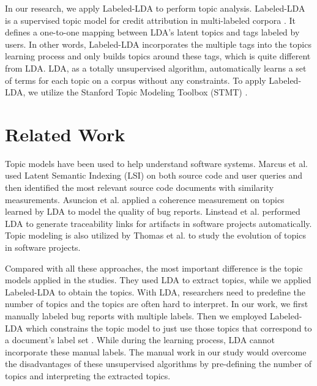 \documentclass[10pt, conference, compsocconf]{IEEEtran}
\begin{document}
In our research, we apply Labeled-LDA to perform topic analysis. Labeled-LDA is a supervised topic model for credit attribution in multi-labeled corpora \cite{labeledlda}. It defines a one-to-one mapping between LDA's latent topics and tags labeled by users. In other words, Labeled-LDA incorporates the multiple tags into the topics learning process and only builds topics around these tags, which is quite different from LDA. LDA, as a totally unsupervised algorithm, automatically learns a set of terms for each topic on a corpus without any constraints. To apply Labeled-LDA, we utilize the Stanford Topic Modeling Toolbox (STMT) \cite{stmt}. 




\section{Related Work}
\label{sec:relatedwork}
Topic models have been used to help understand software systems. Marcus et al. \cite{Marcus04aninformation} used Latent Semantic Indexing (LSI) on both source code and user queries and then identified the most relevant source code documents with similarity measurements. Asuncion et al. \cite{Asuncion:2010} applied a coherence measurement on topics learned by LDA to model the quality of bug reports. Linstead et al. \cite{Linstead:2009} performed LDA to generate traceability links for artifacts in software projects automatically. Topic modeling is also utilized by Thomas et al. \cite{Thomas:2011} to study the evolution of topics in software projects.

Compared with all these approaches, the most important difference is the topic models applied in the studies. They used LDA to extract topics, while we applied Labeled-LDA to obtain the topics. With LDA, researchers need to predefine the number of topics and the topics are often hard to interpret. In our work, we first manually labeled bug reports with multiple labels. Then we employed Labeled-LDA which constrains the topic model to just use those topics that correspond to a document's label set \cite{labeledlda}. While during the learning process, LDA cannot incorporate these manual labels. The manual work in our study would overcome the disadvantages of these unsupervised algorithms by pre-defining the number of topics and interpreting the extracted topics. 
\end{document}
